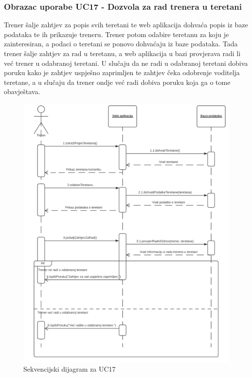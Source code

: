                     \subsubsection{Obrazac uporabe UC17 - Dozvola za rad trenera u teretani}
					\textit{}Trener šalje zahtjev za popis svih teretani te web aplikacija dohvaća popis
                    iz baze podataka te ih prikazuje treneru. Trener potom odabire teretanu za 
                    koju je zainteresiran, a podaci o teretani se ponovo dohvaćaju iz baze podataka.
                    Tada trener šalje zahtjev za rad u teretanu, a web aplikacija u bazi provjerava
                    radi li već trener u odabranoj teretani. U slučaju da ne radi u odabranoj teretani
                    dobiva poruku kako je zahtjev uspješno zaprimljen te zahtjev čeka odobrenje voditelja
                    teretane, a u slučaju da trener ondje već radi dobiva poruku koja ga o tome obavještava.\\
                    
                    \begin{figure}[H]
			            \includegraphics[scale=0.9]{slike/UC17.PNG} %
			            \centering
			            \caption{Sekvencijski dijagram za UC17}
			            \label{fig:promjene}
		            \end{figure}
                    
